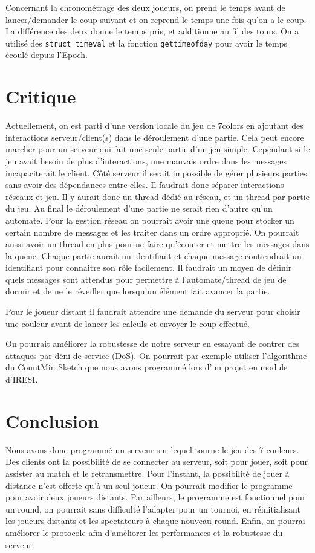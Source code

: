 \documentclass[a4paper]{article}
\begin{document}
Concernant la chronométrage des deux joueurs, on prend le temps avant de 
lancer/demander le coup suivant et on reprend le temps une fois qu'on a le 
coup. La différence des deux donne le temps pris, et additionne au fil des 
tours. On a utilisé des \texttt{struct timeval} et la fonction 
\texttt{gettimeofday} pour avoir le temps écoulé depuis l'Epoch.



\section{Critique}

Actuellement, on est parti d'une version locale du jeu de 7colors en ajoutant
des interactions serveur/client(s) dans le déroulement d'une partie. Cela peut
encore marcher pour un serveur qui fait une seule partie d'un jeu simple.
Cependant si le jeu avait besoin de plus d'interactions, une mauvais ordre dans
les messages incapaciterait le client. Côté serveur il serait impossible de
gérer plusieurs parties sans avoir des dépendances entre elles. Il faudrait donc
séparer interactions réseaux et jeu. Il y aurait donc un thread dédié au réseau,
et un thread par partie du jeu. Au final le déroulement d'une partie ne serait
rien d'autre qu'un automate. Pour la gestion réseau on pourrait avoir une queue
pour stocker un certain nombre de messages et les traiter dans un ordre
approprié. On pourrait aussi avoir un thread en plus pour ne faire qu'écouter et
mettre les messages dans la queue. Chaque partie aurait un identifiant et chaque
message contiendrait un identifiant pour connaitre son rôle facilement. Il
faudrait un moyen de définir quels messages sont attendus pour permettre à
l'automate/thread de jeu de dormir et de ne le réveiller que lorsqu'un élément
fait avancer la partie.


Pour le joueur distant il faudrait attendre une demande du serveur pour choisir 
une couleur avant de lancer les calculs et envoyer le coup effectué.

On pourrait améliorer la robustesse de notre serveur en essayant de contrer des 
attaques par déni de service (DoS). On pourrait par exemple utiliser 
l'algorithme du CountMin Sketch que nous avons programmé lors d'un projet en 
module d'IRESI.


\section*{Conclusion}

Nous avons donc programmé un serveur sur lequel tourne le jeu des 7 couleurs. 
Des clients ont la possibilité de se connecter au serveur, soit pour jouer, 
soit pour assister au match et le retransmettre. Pour l'instant, la possibilité 
de jouer à distance n'est offerte qu'à un seul joueur. On pourrait modifier le 
programme pour avoir deux joueurs distants. Par ailleurs, le programme est 
fonctionnel pour un round, on pourrait sans difficulté l'adapter pour un 
tournoi, en réinitialisant les joueurs distants et les spectateurs à chaque 
nouveau round. Enfin, on pourrai améliorer le protocole afin d'améliorer les 
performances et la robustesse du serveur.


 

\end{document}
